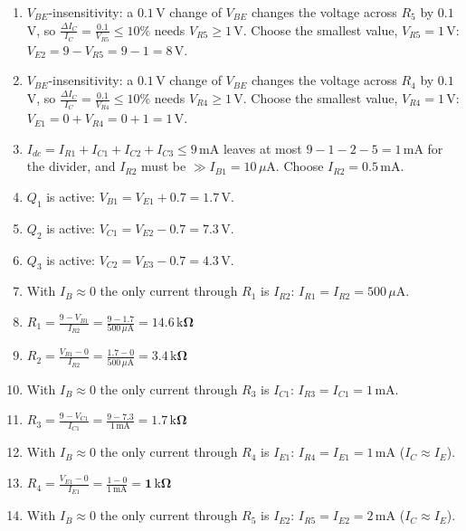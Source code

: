 \documentclass[11pt]{article}
\newcommand{\solstep}[2]{\par\medskip{\color{stepc}\textbf{Step #1 --- #2}}\par\nopagebreak}
\begin{document}
\solstep{2}{Design, node by node}\begin{enumerate}[leftmargin=*,itemsep=3pt]
\item $V_{BE}$-insensitivity: a $0.1$\,V change of $V_{BE}$ changes the voltage across $R_{5}$ by $0.1$\,V, so $\frac{\Delta I_C}{I_C} = \frac{0.1}{V_{R5}} \le 10\%$ needs $V_{R5} \ge 1$\,V. Choose the smallest value, $V_{R5} = 1$\,V: $V_{E2} = 9 - V_{R5} = 9 - 1 = 8\,\mathrm{V}$.
\item $V_{BE}$-insensitivity: a $0.1$\,V change of $V_{BE}$ changes the voltage across $R_{4}$ by $0.1$\,V, so $\frac{\Delta I_C}{I_C} = \frac{0.1}{V_{R4}} \le 10\%$ needs $V_{R4} \ge 1$\,V. Choose the smallest value, $V_{R4} = 1$\,V: $V_{E1} = 0 + V_{R4} = 0 + 1 = 1\,\mathrm{V}$.
\item $I_{dc} = I_{R1} + I_{C1} + I_{C2} + I_{C3} \le 9\,\mathrm{mA}$ leaves at most $9 - 1 - 2 - 5 = 1\,\mathrm{mA}$ for the divider, and $I_{R2}$ must be $\gg I_{B1} = 10\,\mu\mathrm{A}$. Choose $I_{R2} = 0.5\,\mathrm{mA}$.
\item $Q_{1}$ is active: $V_{B1} = V_{E1} + 0.7 = 1.7\,\mathrm{V}$.
\item $Q_{2}$ is active: $V_{C1} = V_{E2} - 0.7 = 7.3\,\mathrm{V}$.
\item $Q_{3}$ is active: $V_{C2} = V_{E3} - 0.7 = 4.3\,\mathrm{V}$.
\item With $I_B\approx0$ the only current through $R_{1}$ is $I_{R2}$: $I_{R1} = I_{R2} = 500\,\mu \mathrm{A}$.
\item $\displaystyle R_{1} = \frac{9 - V_{B1}}{I_{R2}} = \frac{9 - 1.7}{500\,\mu \mathrm{A}} = \mathbf{14.6\,\mathrm{k}\Omega}$
\item $\displaystyle R_{2} = \frac{V_{B1} - 0}{I_{R2}} = \frac{1.7 - 0}{500\,\mu \mathrm{A}} = \mathbf{3.4\,\mathrm{k}\Omega}$
\item With $I_B\approx0$ the only current through $R_{3}$ is $I_{C1}$: $I_{R3} = I_{C1} = 1\,\mathrm{m}\mathrm{A}$.
\item $\displaystyle R_{3} = \frac{9 - V_{C1}}{I_{C1}} = \frac{9 - 7.3}{1\,\mathrm{m}\mathrm{A}} = \mathbf{1.7\,\mathrm{k}\Omega}$
\item With $I_B\approx0$ the only current through $R_{4}$ is $I_{E1}$: $I_{R4} = I_{E1} = 1\,\mathrm{m}\mathrm{A}$ ($I_C\approx I_E$).
\item $\displaystyle R_{4} = \frac{V_{E1} - 0}{I_{E1}} = \frac{1 - 0}{1\,\mathrm{m}\mathrm{A}} = \mathbf{1\,\mathrm{k}\Omega}$
\item With $I_B\approx0$ the only current through $R_{5}$ is $I_{E2}$: $I_{R5} = I_{E2} = 2\,\mathrm{m}\mathrm{A}$ ($I_C\approx I_E$).

\end{enumerate}
\end{document}
